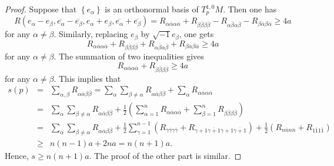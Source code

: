 \documentclass[12pt]{amsart}
\theoremstyle{plain}
\theoremstyle{definition}
\newcommand{\bproof}{\begin{proof}}
\newcommand{\eproof}{\end{proof}}
\renewcommand{\bar}{\overline}
\newcommand{\ee}{\end{eqnarray*}}
\newcommand{\be}{\begin{eqnarray*}}
\renewcommand{\>}{\rightarrow}
\numberwithin{equation}{section} %
\begin{document}
\bproof
Suppose that $\left\{e_\alpha\right\}$ is an orthonormal basis of $T_p^{1,0} M$. 
Then one has
$$
R\left(e_\alpha-e_\beta, \overline{e_\alpha}-\overline{e_\beta}, e_\alpha+e_\beta, \overline{e_\alpha}+\overline{e_\beta}\right)
=R_{\alpha \bar{\alpha} \alpha \bar{\alpha}}+R_{\beta \bar{\beta} \beta \bar{\beta}}
-R_{\alpha \bar{\beta} \alpha \bar{\beta}}-R_{\beta \bar{\alpha} \beta \bar{\alpha}}
\ge 4 a
$$
for any $\alpha \neq \beta$.
Similarly, replacing $e_\beta$ by $\sqrt{-1} e_\beta$, one gets
$$
R_{\alpha \bar{\alpha} \alpha \bar{\alpha}}+R_{\beta \bar{\beta} \beta \bar{\beta}}
+R_{\alpha \bar{\beta} \alpha \bar{\beta}}+R_{\beta \bar{\alpha} \beta \bar{\alpha}}
\ge 4 a 
$$	for any $\alpha \neq \beta$.
The summation of  two inequalities gives
$$
R_{\alpha \bar{\alpha} \alpha \bar{\alpha}}+R_{\beta \bar{\beta} \beta \bar{\beta}}\ge 4a 
$$
for any $\alpha \neq \beta$.	This implies that
\be
s(p) & =& \sum_{\alpha, \beta} R_{\alpha \bar{\alpha} \beta \bar{\beta}}=\sum_\alpha \sum_{\beta \neq \alpha} R_{\alpha \bar{\alpha} \beta \bar{\beta}}+\sum_\alpha R_{\alpha \bar{\alpha} \alpha \bar{\alpha}} \\
& =& \sum_\alpha \sum_{\beta \neq \alpha} R_{\alpha \bar{\alpha} \beta \bar{\beta}}
+\frac{1}{2}\left(\sum_{\alpha=1}^n R_{\alpha \bar{\alpha} \alpha \bar{\alpha}}
+\sum_{\beta=1}^n R_{\beta \bar{\beta} \beta \bar{\beta}}\right) \\
& =&\sum_\alpha \sum_{\beta \neq \alpha} R_{\alpha \bar{\alpha} \beta \bar{\beta}}
+\frac{1}{2} \sum_{\gamma=1}^{n-1}\left(R_{\gamma \bar{\gamma} \gamma \bar{\gamma}}
+R_{\gamma+1 \overline{\gamma+1} \gamma+1 \overline{\gamma+1}}\right)
+\frac{1}{2}\left(R_{n \bar{n} n \bar{n}}+R_{1 \overline{1} 1 \overline{1}}\right) \\
& \ge&n(n-1)a+2na= n(n+1)a .
\ee
Hence, $s\ge n(n+1)a$.  The proof of the other part is similar. 
\eproof 
\end{document}
